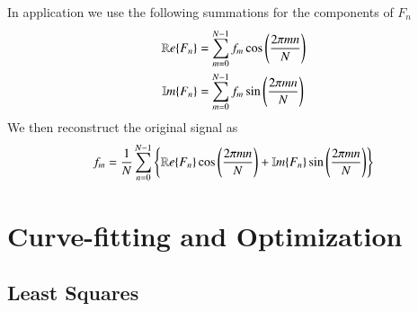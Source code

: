 \documentclass[12pt]{report}
\begin{document}
\begin{proc}{}{}
        In application we use the following summations for the components of $F_n$ \begin{align}
                \mathbb R e\{F_n\} &= \sum_{m=0}^{N-1}f_m\cos\left(\frac{2\pi mn}{N}\right) \\
                \mathbb{I}m\{F_n\} &= \sum_{m=0}^{N-1}f_m\sin\left(\frac{2\pi mn}{N}\right)
        \end{align}
        We then reconstruct the original signal as \begin{equation}
                f_m = \frac{1}{N}\sum_{n=0}^{N-1}\left\{\mathbb R e\{F_n\}\cos\left(\frac{2\pi mn}{N}\right) + \mathbb{I}m\{F_n\}\sin\left(\frac{2\pi mn}{N}\right)\right\}
        \end{equation}
\end{proc}




\chapter{Curve-fitting and Optimization}


\section{Least Squares}
\end{document}
